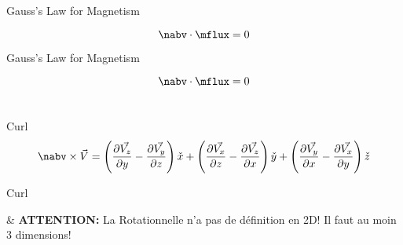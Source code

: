\begin{frame}{Gauss's Law for Magnetism}
    \begin{twocolumns}[0.35]
        \leftcol
            \vspace{-8pt}
            \begin{equation}
                \nabv \cdot \mflux = 0
            \end{equation}
        \rightcol
    \end{twocolumns}
\end{frame}

\begin{frame}{Gauss's Law for Magnetism}
    \begin{twocolumns}[0.35]
        \leftcol
            \vspace{-8pt}
            \begin{equation}
                \nabv \cdot \mflux = 0
            \end{equation}\\
            \vspace{10pt}
        \rightcol
    \end{twocolumns}
\end{frame}



\begin{frame}{Curl}
    \begin{equation}
        \nabv \times \vec{V} = \left(\frac{\partial\vec{V_z}}{\partial y}-\frac{\partial\vec{V_y}}{\partial z} \right) \check{x} +
        \left(\frac{\partial\vec{V_x}}{\partial z}-\frac{\partial\vec{V_z}}{\partial x} \right) \check{y} +
        \left(\frac{\partial\vec{V_y}}{\partial x}-\frac{\partial\vec{V_x}}{\partial y} \right) \check{z}
    \end{equation}

\begin{twocolumns}[0.5]
    \leftcol
    \rightcol
 \end{twocolumns}
\end{frame}

\begin{frame}{Curl}
    \begin{makelist}[\small][1.5]
        \icon[red]{\faExclamationTriangle} & \textbf{ATTENTION:} La Rotationnelle n'a pas de définition en 2D! Il faut au moin 3 dimensions!
    \end{makelist}
\end{frame}

